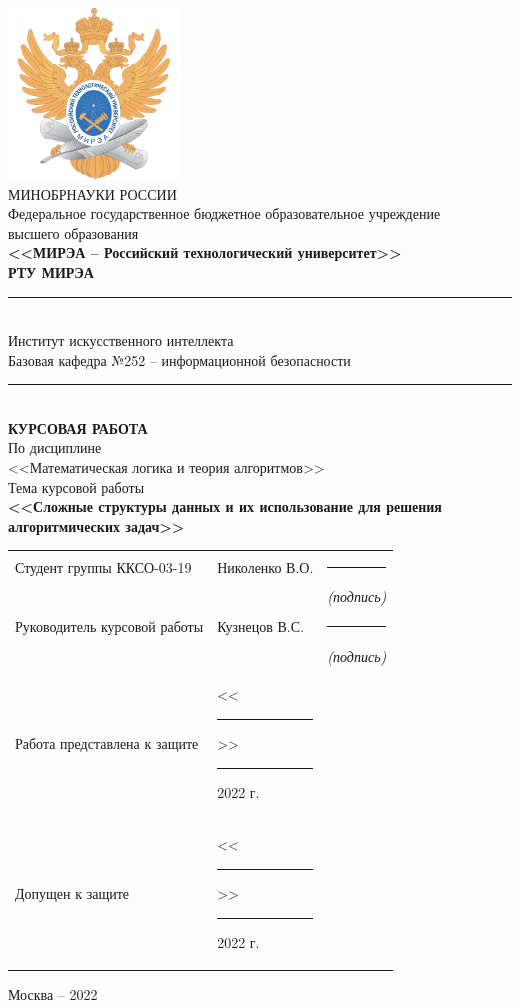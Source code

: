 \documentclass[utf8,14pt,a4paper,oneside,russian]{book}
\begin{document}
	
	\thispagestyle{empty}
	\small
	\begin{center}
		\includegraphics[width=4.55cm]{logo_mirea}\\
		\MakeUppercase{Минобрнауки России}\\[1em]
		Федеральное государственное бюджетное образовательное учреждение\\
		высшего образования\\[0.5em]
		\textbf{<<МИРЭА -- Российский технологический университет>>}\\
		\textbf{РТУ МИРЭА}\\
		\rule{\textwidth}{0.75pt}\\
		Институт искусственного интеллекта\\
		Базовая кафедра №252 -- информационной безопасности\\[-0.45em]
		\rule{\textwidth}{0.75pt}\\[5em]
		\normalsize\MakeUppercase{\textbf{Курсовая работа}}\small\\[0.5em]
		По дисциплине\\ <<Математическая логика и теория алгоритмов>>\\[1.5em]
		Тема курсовой работы\\ \textbf{<<Сложные структуры данных и их использование для решения алгоритмических задач>>} \\[3em]
		\begin{tabular}{p{7cm}p{6cm}c}
			Студент группы ККСО-03-19 & Николенко В.О. & \rule{2cm}{0.75pt}\\[-0.5em]
			& & \footnotesize\textit{(подпись)}\small\\[1em]
			Руководитель курсовой работы & Кузнецов В.С. & \rule{2cm}{0.75pt}\\[-0.5em]
			& & \footnotesize\textit{(подпись)}\small\\[5em]
			Работа представлена к защите & <<\rule{0.5cm}{0.75pt}>> \rule{2cm}{0.75pt} 2022 г. & \\[1em]
			Допущен к защите & <<\rule{0.5cm}{0.75pt}>> \rule{2cm}{0.75pt} 2022 г. & \\[1em]
		\end{tabular}
		\vfill
		Москва -- 2022
	\end{center}
	\normalsize
	\newpage
	
\end{document}
